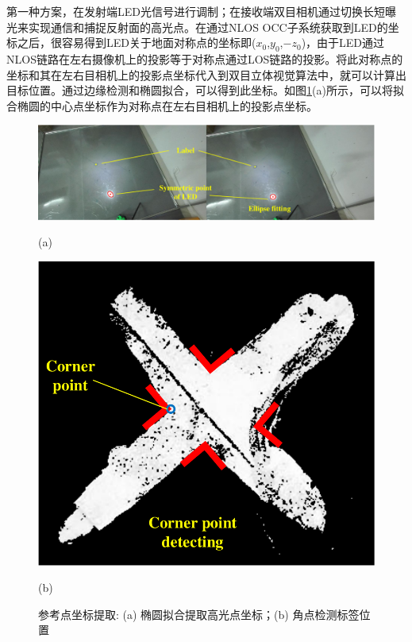 第一种方案，在发射端LED光信号进行调制；在接收端双目相机通过切换长短曝光来实现通信和捕捉反射面的高光点。在通过NLOS OCC子系统获取到LED的坐标之后，很容易得到LED关于地面对称点的坐标即(${x_{0}}$,${y_{0}}$,$-z_{0}$)，由于LED通过NLOS链路在左右摄像机上的投影等于对称点通过LOS链路的投影。将此对称点的坐标和其在左右目相机上的投影点坐标代入到双目立体视觉算法中，就可以计算出目标位置。通过边缘检测和椭圆拟合，可以得到此坐标。如图\ref{fig:dual_imageprocessing}(a)所示，可以将拟合椭圆的中心点坐标作为对称点在左右目相机上的投影点坐标。
\begin{figure}[!htbp]
\begin{minipage}{0.75\linewidth}
  \centerline{\includegraphics[width=\textwidth]{FIG/imageprocessing.pdf}}
  \centerline{(a)}
  \label{fig:imageprocessing-a}
\end{minipage}
\hfill
\begin{minipage}{0.23\linewidth}
  \centerline{\includegraphics[width=\textwidth]{FIG/cornerdetecting.pdf}}
  \centerline{(b)}
  \label{fig:imageprocessing-b}
\end{minipage}
\vfill
\caption{参考点坐标提取: (a) 椭圆拟合提取高光点坐标；(b) 角点检测标签位置}
\label{fig:dual_imageprocessing}
\end{figure}


